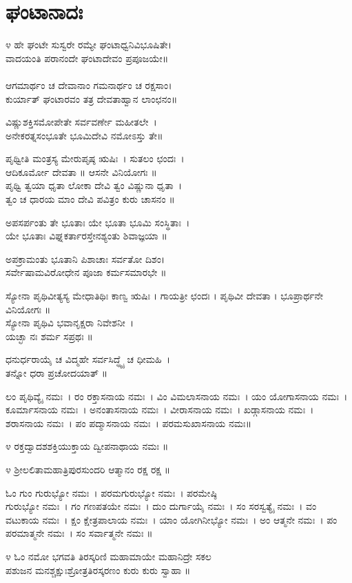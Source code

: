 \section{ಘಂಟಾನಾದಃ}
೪ ಹೇ ಘಂಟೇ ಸುಸ್ವರೇ ರಮ್ಯೇ ಘಂಟಾಧ್ವನಿವಿಭೂಷಿತೇ।\\
ವಾದಯಂತಿ ಪರಾನಂದೇ ಘಂಟಾದೇವಂ ಪ್ರಪೂಜಯೇ॥\\
\\
ಆಗಮಾರ್ಥಂ ಚ ದೇವಾನಾಂ ಗಮನಾರ್ಥಂ ಚ ರಕ್ಷಸಾಂ।\\
ಕುರ್ಯಾತ್ ಘಂಟಾರವಂ ತತ್ರ ದೇವತಾಹ್ವಾನ ಲಾಂಛನಂ॥

ವಿಷ್ಣುಶಕ್ತಿಸಮೋಪೇತೇ ಸರ್ವವರ್ಣೇ ಮಹೀತಲೇ~।\\
ಅನೇಕರತ್ನಸಂಭೂತೇ ಭೂಮಿದೇವಿ ನಮೋಽಸ್ತು ತೇ॥

ಪೃಥ್ವೀತಿ ಮಂತ್ರಸ್ಯ ಮೇರುಪೃಷ್ಠ ಋಷಿಃ~। ಸುತಲಂ ಛಂದಃ~।\\ಆದಿಕೂರ್ಮೋ ದೇವತಾ ॥ ಆಸನೇ ವಿನಿಯೋಗಃ ॥\\
ಪೃಥ್ವಿ ತ್ವಯಾ ಧೃತಾ ಲೋಕಾ ದೇವಿ ತ್ವಂ ವಿಷ್ಣುನಾ ಧೃತಾ~।\\
ತ್ವಂ ಚ ಧಾರಯ ಮಾಂ ದೇವಿ ಪವಿತ್ರಂ ಕುರು ಚಾಸನಂ ॥

ಅಪಸರ್ಪಂತು ತೇ ಭೂತಾಃ ಯೇ ಭೂತಾ ಭೂಮಿ ಸಂಸ್ಥಿತಾಃ~।\\
ಯೇ ಭೂತಾಃ ವಿಘ್ನಕರ್ತಾರಸ್ತೇನಶ್ಯಂತು ಶಿವಾಜ್ಞಯಾ ॥

ಅಪಕ್ರಾಮಂತು ಭೂತಾನಿ ಪಿಶಾಚಾಃ ಸರ್ವತೋ ದಿಶಂ।\\
ಸರ್ವೇಷಾಮವಿರೋಧೇನ ಪೂಜಾ ಕರ್ಮಸಮಾರಭೇ ॥

ಸ್ಯೋನಾ ಪೃಥಿವೀತ್ಯಸ್ಯ ಮೇಧಾತಿಥಿಃ ಕಾಣ್ವ ಋಷಿಃ । ಗಾಯತ್ರೀ ಛಂದಃ । ಪೃಥಿವೀ ದೇವತಾ । ಭೂಪ್ರಾರ್ಥನೇ ವಿನಿಯೋಗಃ ॥\\
ಸ್ಯೋನಾ ಪೃಥಿವಿ ಭವಾನೃಕ್ಷರಾ ನಿವೇಶನೀ~।\\ ಯಚ್ಛಾ ನಃ ಶರ್ಮ ಸಪ್ರಥಃ ॥

ಧನುರ್ಧರಾಯೈ ಚ ವಿದ್ಮಹೇ ಸರ್ವಸಿದ್ಧ್ಯೈ ಚ ಧೀಮಹಿ~।\\ ತನ್ನೋ ಧರಾ ಪ್ರಚೋದಯಾತ್ ॥

ಲಂ ಪೃಥಿವ್ಯೈ ನಮಃ~। ರಂ ರಕ್ತಾಸನಾಯ ನಮಃ~। ವಿಂ ವಿಮಲಾಸನಾಯ ನಮಃ~। ಯಂ ಯೋಗಾಸನಾಯ ನಮಃ~। ಕೂರ್ಮಾಸನಾಯ ನಮಃ~। ಅನಂತಾಸನಾಯ ನಮಃ~। ವೀರಾಸನಾಯ ನಮಃ~। ಖಡ್ಗಾಸನಾಯ ನಮಃ~। ಶರಾಸನಾಯ ನಮಃ~। ಪಂ ಪದ್ಮಾಸನಾಯ ನಮಃ~। ಪರಮಸುಖಾಸನಾಯ ನಮಃ॥

೪ ರಕ್ತದ್ವಾದಶಶಕ್ತಿಯುಕ್ತಾಯ ದ್ವೀಪನಾಥಾಯ ನಮಃ ॥

೪ ಶ್ರೀಲಲಿತಾಮಹಾತ್ರಿಪುರಸುಂದರಿ ಆತ್ಮಾನಂ ರಕ್ಷ ರಕ್ಷ ॥

ಓಂ ಗುಂ ಗುರುಭ್ಯೋ ನಮಃ~। ಪರಮಗುರುಭ್ಯೋ ನಮಃ~। ಪರಮೇಷ್ಠಿ\\ಗುರುಭ್ಯೋ ನಮಃ~। ಗಂ ಗಣಪತಯೇ ನಮಃ~। ದುಂ ದುರ್ಗಾಯೈ ನಮಃ~। ಸಂ ಸರಸ್ವತ್ಯೈ ನಮಃ~। ವಂ ವಟುಕಾಯ ನಮಃ~। ಕ್ಷಂ ಕ್ಷೇತ್ರಪಾಲಾಯ ನಮಃ~। ಯಾಂ ಯೋಗಿನೀಭ್ಯೋ ನಮಃ~। ಅಂ ಆತ್ಮನೇ ನಮಃ~। ಪಂ ಪರಮಾತ್ಮನೇ ನಮಃ~। ಸಂ ಸರ್ವಾತ್ಮನೇ ನಮಃ ॥

೪ ಓಂ ನಮೋ ಭಗವತಿ ತಿರಸ್ಕರಿಣಿ ಮಹಾಮಾಯೇ ಮಹಾನಿದ್ರೇ ಸಕಲ \\ಪಶುಜನ ಮನಶ್ಚಕ್ಷುಃಶ್ರೋತ್ರತಿರಸ್ಕರಣಂ ಕುರು ಕುರು ಸ್ವಾಹಾ ॥

